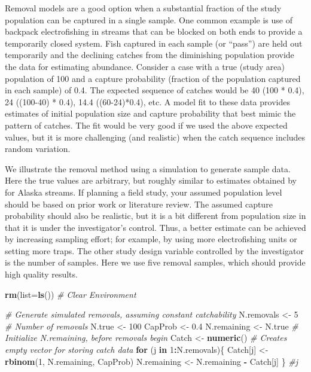 \documentclass[
]{krantz}
\makeatletter
\newenvironment{Shaded}{\begin{snugshade}}{\end{snugshade}}
\newcommand{\AttributeTok}[1]{\textcolor[rgb]{0.27,0.27,0.27}{#1}}
\newcommand{\CommentTok}[1]{\textcolor[rgb]{0.37,0.37,0.37}{\textit{#1}}}
\newcommand{\ControlFlowTok}[1]{\textcolor[rgb]{0.27,0.27,0.27}{\textbf{#1}}}
\newcommand{\DecValTok}[1]{\textcolor[rgb]{0.06,0.06,0.06}{#1}}
\newcommand{\FloatTok}[1]{\textcolor[rgb]{0.06,0.06,0.06}{#1}}
\newcommand{\FunctionTok}[1]{\textcolor[rgb]{0.27,0.27,0.27}{\textbf{#1}}}
\newcommand{\NormalTok}[1]{#1}
\newcommand{\OtherTok}[1]{\textcolor[rgb]{0.37,0.37,0.37}{#1}}
\newcommand{\SpecialCharTok}[1]{\textcolor[rgb]{0.43,0.43,0.43}{\textbf{#1}}}
\newenvironment{kframe}{%
\medskip{}
\setlength{\fboxsep}{.8em}
 \def\at@end@of@kframe{}%
 \ifinner\ifhmode%
  \def\at@end@of@kframe{\end{minipage}}%
  \begin{minipage}{\columnwidth}%
 \fi\fi%
 \def\FrameCommand##1{\hskip\@totalleftmargin \hskip-\fboxsep
 \colorbox{shadecolor}{##1}\hskip-\fboxsep
     \hskip-\linewidth \hskip-\@totalleftmargin \hskip\columnwidth}%
 \MakeFramed {\advance\hsize-\width
   \@totalleftmargin\z@ \linewidth\hsize
   \@setminipage}}%
 {\par\unskip\endMakeFramed%
 \at@end@of@kframe}
\renewenvironment{Shaded}{\begin{kframe}}{\end{kframe}}
\makeatother
\begin{document}
Removal models are a good option when a substantial fraction of the study population can be captured in a single sample. One common example is use of backpack electrofishing in streams that can be blocked on both ends to provide a temporarily closed system. Fish captured in each sample (or ``pass'') are held out temporarily and the declining catches from the diminishing population provide the data for estimating abundance. Consider a case with a true (study area) population of 100 and a capture probability (fraction of the population captured in each sample) of 0.4. The expected sequence of catches would be 40 (100 * 0.4), 24 ((100-40) * 0.4), 14.4 ((60-24)*0.4), etc. A model fit to these data provides estimates of initial population size and capture probability that best mimic the pattern of catches. The fit would be very good if we used the above expected values, but it is more challenging (and realistic) when the catch sequence includes random variation.

We illustrate the removal method using a simulation to generate sample data. Here the true values are arbitrary, but roughly similar to estimates obtained by \citet{bryant2000} for Alaska streams. If planning a field study, your assumed population level should be based on prior work or literature review. The assumed capture probability should also be realistic, but it is a bit different from population size in that it is under the investigator's control. Thus, a better estimate can be achieved by increasing sampling effort; for example, by using more electrofishing units or setting more traps. The other study design variable controlled by the investigator is the number of samples. Here we use five removal samples, which should provide high quality results.

\begin{Shaded}
\begin{Highlighting}[]
\FunctionTok{rm}\NormalTok{(}\AttributeTok{list=}\FunctionTok{ls}\NormalTok{()) }\CommentTok{\# Clear Environment}

\CommentTok{\# Generate simulated removals, assuming constant catchability}
\NormalTok{N.removals }\OtherTok{\textless{}{-}} \DecValTok{5} \CommentTok{\# Number of removals}
\NormalTok{N.true }\OtherTok{\textless{}{-}} \DecValTok{100}
\NormalTok{CapProb }\OtherTok{\textless{}{-}} \FloatTok{0.4}
\NormalTok{N.remaining }\OtherTok{\textless{}{-}}\NormalTok{ N.true }\CommentTok{\# Initialize N.remaining, before removals begin}
\NormalTok{Catch }\OtherTok{\textless{}{-}} \FunctionTok{numeric}\NormalTok{() }\CommentTok{\# Creates empty vector for storing catch data}
\ControlFlowTok{for}\NormalTok{ (j }\ControlFlowTok{in} \DecValTok{1}\SpecialCharTok{:}\NormalTok{N.removals)\{}
\NormalTok{  Catch[j] }\OtherTok{\textless{}{-}} \FunctionTok{rbinom}\NormalTok{(}\DecValTok{1}\NormalTok{, N.remaining, CapProb)}
\NormalTok{  N.remaining }\OtherTok{\textless{}{-}}\NormalTok{ N.remaining }\SpecialCharTok{{-}}\NormalTok{ Catch[j]}
\NormalTok{  \} }\CommentTok{\#j}
\end{Highlighting}
\end{Shaded}
\end{document}
